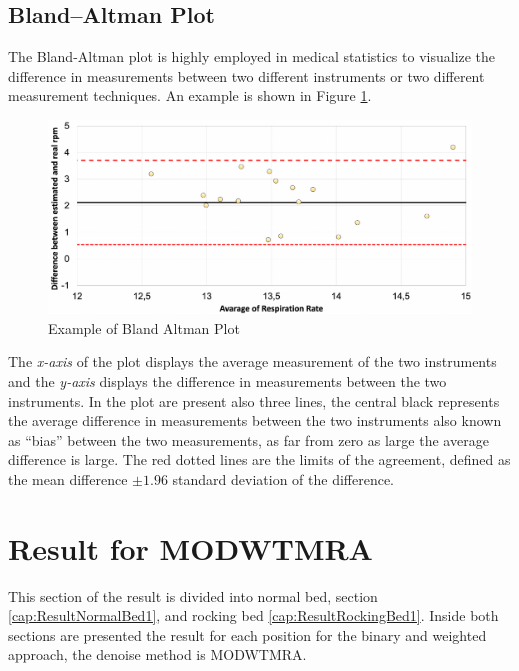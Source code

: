 \subsection{Bland–Altman Plot} \label{cap:plottino}
The Bland-Altman plot is highly employed in medical statistics to visualize the difference in measurements between two different instruments or two different measurement techniques. An example is shown in Figure \ref{fig:exxampleBland}.

\vspace{1cm}
\begin{figure}[H]
  \centering
  \includegraphics[width=\textwidth]{img/balnd1.pdf}
  \caption{Example of Bland Altman Plot}
  \label{fig:exxampleBland}
\end{figure}
\vspace{1cm}

The \textit{x-axis} of the plot displays the average measurement of the two instruments and the \textit{y-axis} displays the difference in measurements between the two instruments. In the plot are present also three lines, the central black represents the average difference in measurements between the two instruments also known as ``bias'' between the two measurements, as far from zero as large the average difference is large. The red dotted lines are the limits of the agreement, defined as the mean difference $\pm 1.96$ standard deviation of the difference. 




\clearpage
\section{Result for MODWTMRA} \label{cap:ResultMODWTRA}


This section of the result is divided into normal bed, section \ref{cap:ResultNormalBed1}, and rocking bed \ref{cap:ResultRockingBed1}. Inside both sections are presented the result for each position for the binary and weighted approach, the denoise method is MODWTMRA.

